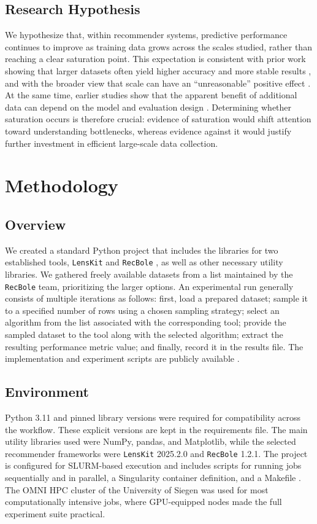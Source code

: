\documentclass[sigconf,nonacm]{acmart}
\begin{document}
\subsection{Research Hypothesis}
We hypothesize that, within recommender systems, predictive performance continues to improve as training data grows across the scales studied, rather than reaching a clear saturation point. This expectation is consistent with prior work showing that larger datasets often yield higher accuracy and more stable results \cite{ajiboye2015}, and with the broader view that scale can have an ``unreasonable'' positive effect \cite{halevy2009}. At the same time, earlier studies show that the apparent benefit of additional data can depend on the model and evaluation design \cite{catal2009,vabalas2019}. Determining whether saturation occurs is therefore crucial: evidence of saturation would shift attention toward understanding bottlenecks, whereas evidence against it would justify further investment in efficient large-scale data collection.

\section{Methodology}
\subsection{Overview}
We created a standard Python project that includes the libraries for two established tools, \texttt{LensKit} \cite{LKPY} and \texttt{RecBole} \cite{recbole}, as well as other necessary utility libraries. We gathered freely available datasets from a list \cite{recbole_datasets_page, recbole_datasets_repo} maintained by the \texttt{RecBole} team, prioritizing the larger options. An experimental run generally consists of multiple iterations as follows: first, load a prepared dataset; sample it to a specified number of rows using a chosen sampling strategy; select an algorithm from the list associated with the corresponding tool; provide the sampled dataset to the tool along with the selected algorithm; extract the resulting performance metric value; and finally, record it in the results file. The implementation and experiment scripts are publicly available \cite{repo}.

\subsection{Environment}
Python 3.11 and pinned library versions were required for compatibility across the workflow. These explicit versions are kept in the requirements file. The main utility libraries used were NumPy, pandas, and Matplotlib, while the selected recommender frameworks were \texttt{LensKit} 2025.2.0 and \texttt{RecBole} 1.2.1. The project is configured for SLURM-based \cite{slurm} execution and includes scripts for running jobs sequentially and in parallel, a Singularity \cite{singularity} container definition, and a Makefile \cite{make}. The OMNI HPC cluster of the University of Siegen was used for most computationally intensive jobs, where GPU-equipped nodes made the full experiment suite practical.
\end{document}
